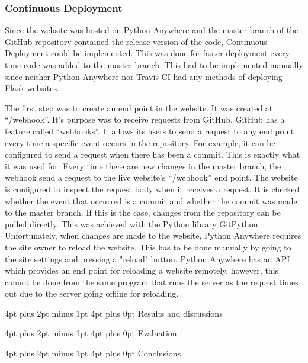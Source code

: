 \documentclass[12pt,a4paper]{article}
\makeatletter
\renewcommand\section{\@startsection {section}{1}{0mm} %
                                     {4pt plus 2pt minus 1pt} %
                                     {4pt plus 0pt} %
                                     {\bfseries}}
\makeatother
\begin{document}
\subsubsection{Continuous Deployment}
Since the website was hosted on Python Anywhere and the master branch of the GitHub repository contained the release version of the code, Continuous Deployment could be implemented. This was done for faster deployment every time code was added to the master branch. This had to be implemented manually since neither Python Anywhere nor Travis CI had any methods of deploying Flask websites. 

The first step was to create an end point in the website. It was created at “/webhook”. It’s purpose was to receive requests from GitHub. GitHub has a feature called “webhooks”. It allows its users to send a request to any end point every time a specific event occurs in the repository. For example, it can be configured to send a request when there has been a commit. This is exactly what it was used for. Every time there are new changes in the master branch, the webhook send a request to the live website’s “/webhook” end point. The website is configured to inspect the request body when it receives a request. It is checked whether the event that occurred is a commit and whether the commit was made to the master branch. If this is the case, changes from the repository can be pulled directly. This was achieved with the Python library GitPython. Unfortunately, when changes are made to the website, Python Anywhere requires the site owner to reload the website. This has to be done manually by going to the site settings and pressing a "reload" button. Python Anywhere has an API which provides an end point for reloading a website remotely, however, this cannot be done from the same program that runs the server as the request times out due to the server going offline for reloading. 

\newpage
\section{Results and discussions}

\newpage
\section{Evaluation}

\newpage
\section{Conclusions}
\end{document}
